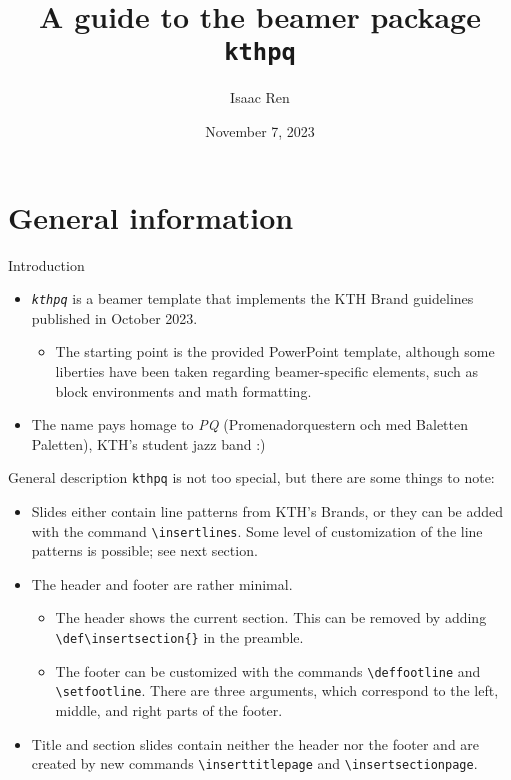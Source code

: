 \documentclass[17pt, t, lualatex]{beamer}
\title{A guide to the beamer package \texttt{kthpq}}
\date{November 7, 2023}
\institute[KTH]{KTH Royal Institute of Technology}
\author[Isaac Ren]{Isaac Ren}
\def\kthpq{\texttt{kthpq}}
\begin{document}
\inserttitlepage[center]

\begin{frame}
\tableofcontents
\end{frame}

\section{General information}

\insertsectionpage

\begin{frame}{Introduction}
\begin{itemize}
\item \emph{\kthpq{}} is a beamer template that implements the KTH Brand guidelines published in October 2023.
\begin{itemize}
\item The starting point is the provided PowerPoint template, although some liberties have been taken regarding beamer-specific elements, such as block environments and math formatting.
\end{itemize}
\item The name pays homage to \emph{PQ} (Promenadorquestern och med Baletten Paletten), KTH's student jazz band :)
\end{itemize}
\end{frame}

\begin{frame}[fragile=singleslide]{General description}
\kthpq{} is not too special, but there are some things to note:
\begin{itemize}
\item Slides either contain line patterns from KTH's Brands, or they can be added with the command \verb|\insertlines|. Some level of customization of the line patterns is possible; see next section.
\item The header and footer are rather minimal.
\begin{itemize}
\item The header shows the current section. This can be removed by adding \verb|\def\insertsection{}| in the preamble.
\item The footer can be customized with the commands \verb|\deffootline| and \verb|\setfootline|. There are three arguments, which correspond to the left, middle, and right parts of the footer.
\end{itemize}
\item Title and section slides contain neither the header nor the footer and are created by new commands \verb|\inserttitlepage| and \verb|\insertsectionpage|.
\end{itemize}
\end{frame}
\end{document}

